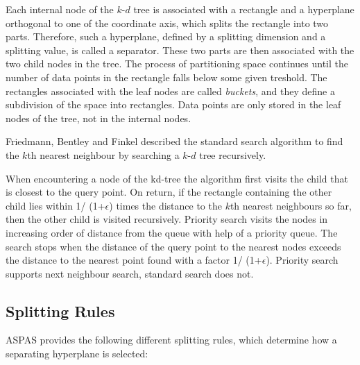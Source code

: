 Each internal node of the $k$-$d$ tree is associated with a rectangle
and a hyperplane orthogonal to
one of the coordinate axis, which splits the rectangle into two parts.
Therefore, such a hyperplane, defined by a splitting dimension
and a splitting value, is called a separator.
These two parts are then associated
with the two child nodes in the tree. The process of partitioning space continues until the number of data
points in the rectangle falls below some given treshold. The rectangles associated with the leaf nodes
are called {\it buckets}, and they define a subdivision of the space into rectangles.
Data points are only stored in the leaf nodes of the tree, not in the internal nodes.

Friedmann, Bentley and Finkel \cite{fbf-afbml-77} described the standard
search algorithm to find the $k$th nearest neighbour by searching a $k$-$d$ tree recursively.

When encountering a node of the kd-tree the algorithm first visits the child that is closest
to the query point. On return, if the rectangle containing  the other child lies within
1/ (1+$\epsilon$) times the distance to the $k$th nearest neighbours so far, then
the other child is visited recursively.
Priority search \cite{am-annqf-93} visits the nodes in increasing order of distance from
the queue with help of a priority queue.
The search stops when the distance of the query point to the nearest nodes
exceeds the distance to the nearest point found with a factor 1/ (1+$\epsilon$).
Priority search supports next neighbour search, standard search does not.

\subsection {Splitting Rules}

ASPAS provides the following different splitting rules,
which determine how a separating hyperplane is selected:

